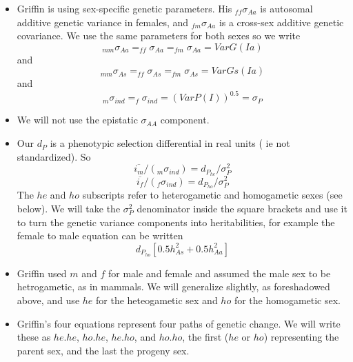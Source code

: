 \documentclass[titlepage]{article}  %
\begin{document}
\begin{itemize}
\item Griffin is using sex-specific genetic parameters. His $_{ff}\sigma_{Aa}$ is autosomal additive genetic variance in females, and $_{fm}\sigma_{Aa}$ is a cross-sex additive genetic covariance. We use the same parameters for both sexes so we write
\begin{displaymath}
 _{mm}\sigma_{Aa} = _{ff}\sigma_{Aa} = _{fm}\sigma_{Aa} = VarG(Ia)
\end{displaymath}
and 
\begin{displaymath}
 _{mm}\sigma_{As} = _{ff}\sigma_{As} = _{fm}\sigma_{As} = VarGs(Ia)
\end{displaymath}
and
\begin{displaymath}
 _{m}\sigma_{ind} = _{f}\sigma_{ind} = (VarP(I))^{0.5} = \sigma_{P}
\end{displaymath}
\item  We will not use the epistatic $\sigma_{AA}$ component.
\item Our $d_{P}$ is a phenotypic selection differential in real units ( ie not standardized). So 
\begin{displaymath}
\overline{i_{m}}/(_{m}\sigma_{ind}) = d_{P_{he}}/\sigma^{2}_{P}
\end{displaymath}
\begin{displaymath}
\overline{i_{f}}/(_{f}\sigma_{ind}) = d_{P_{ho}}/\sigma^{2}_{P}
\end{displaymath}
The $he$ and $ho$ subscripts refer to heterogametic and homogametic sexes (see below). 
We will take the $\sigma^{2}_{P}$ denominator inside the square brackets and use it to turn the genetic variance components into heritabilities, for example the female to male equation can be written
\begin{displaymath}
d_{P_{ho}}[0.5 h^{2}_{As} + 0.5 h^{2}_{Aa}]
\end{displaymath}

\item Griffin used $m$ and $f$ for male and female and assumed the male sex to be hetrogametic, as in mammals. We will generalize slightly, as foreshadowed above, and use $he$ for the heteogametic sex and $ho$ for the homogametic sex.
\item Griffin's four equations represent four paths of genetic change. We  will write these as $he.he$, $ho.he$, $he.ho$, and $ho.ho$, the first ($he$ or $ho$) representing the parent sex, and the last the progeny sex.

\end{itemize}
\end{document}
